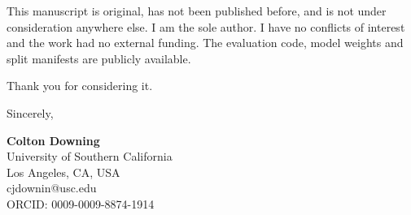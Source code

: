 \documentclass[11pt]{article}
\begin{document}
\noindent This manuscript is original, has not been published before, and is not under
consideration anywhere else. I am the sole author. I have no conflicts of
interest and the work had no external funding. The evaluation code, model weights
and split manifests are publicly available.
\vspace{1em}

\noindent Thank you for considering it.
\vspace{2em}

\noindent Sincerely,
\vspace{1.5em}

\noindent \textbf{Colton Downing}\\
University of Southern California\\
Los Angeles, CA, USA\\
cjdownin@usc.edu\\
ORCID: 0009-0009-8874-1914
\end{document}
